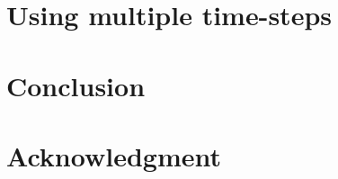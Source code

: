 \documentclass[pra,superscriptaddress,groupedaddress,twocolumn]{revtex4}
\begin{document}

 


\section{Using multiple time-steps}


\section{Conclusion}
 

\section{Acknowledgment}



\end{document}
